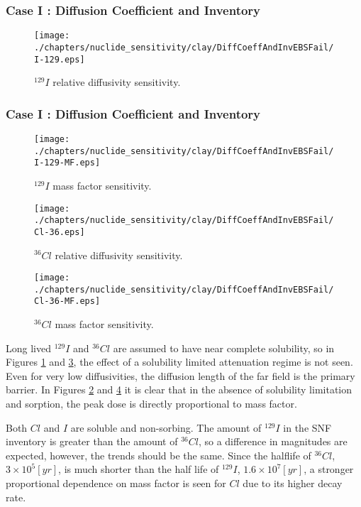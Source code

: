 \begin{frame}[c]
\begin{frame}[c]
\begin{frame}[c]
\begin{frame}[c]
\begin{frame}[c]
\begin{frame}[c]
\begin{frame}[c]
\begin{frame}[c]
  \frametitle{Case I : Diffusion Coefficient and Inventory}
\begin{figure}[ht]
\centering
\texttt{[image: ./chapters/nuclide\_sensitivity/clay/DiffCoeffAndInvEBSFail/I-129.eps]}
\caption{$^{129}I$ relative diffusivity sensitivity.}
\label{fig:DCInvI129}
\end{figure}

\begin{frame}[c]
  \frametitle{Case I : Diffusion Coefficient and Inventory}
\begin{figure}[ht]
\centering
\texttt{[image: ./chapters/nuclide\_sensitivity/clay/DiffCoeffAndInvEBSFail/I-129-MF.eps]}
\caption{$^{129}I$ mass factor sensitivity.}
\label{fig:DCInvI129MF}
\end{figure}

\begin{figure}[ht]
\centering
\texttt{[image: ./chapters/nuclide\_sensitivity/clay/DiffCoeffAndInvEBSFail/Cl-36.eps]}
\caption{$^{36}Cl$ relative diffusivity sensitivity.}
\label{fig:DCInvCl36}
\end{figure}

\begin{figure}[ht]
\centering
\texttt{[image: ./chapters/nuclide\_sensitivity/clay/DiffCoeffAndInvEBSFail/Cl-36-MF.eps]}
\caption{$^{36}Cl$ mass factor sensitivity.}
\label{fig:DCInvCl36MF}
\end{figure}

Long lived $^{129}I$ and $^{36}Cl$ are assumed to have near complete solubility, 
so in Figures \ref{fig:DCInvI129} and \ref{fig:DCInvCl36}, the effect of a 
solubility limited attenuation regime is not seen. Even for very low 
diffusivities, the diffusion length of the far field is the primary barrier. In 
Figures \ref{fig:DCInvI129MF} and \ref{fig:DCInvCl36MF} it is clear that in the 
absence of solubility limitation and sorption, the peak dose is directly 
proportional to mass factor. 

Both $Cl$ and $I$ are soluble and non-sorbing. The amount of $^{129}I$ in the 
\gls{SNF} inventory is greater than the amount of $^{36}Cl$, so a difference in 
magnitudes are expected, however, the trends should be the same. Since the 
halflife of $^{36}Cl$, $3\times10^5[yr]$, is much shorter than the half life of 
$^{129}I$, $1.6\times10^7[yr]$, a stronger proportional dependence on mass 
factor is seen for $Cl$ due to its higher decay rate. 


\end{frame}
\end{frame}
\end{frame}
\end{frame}
\end{frame}
\end{frame}
\end{frame}
\end{frame}
\end{frame}
